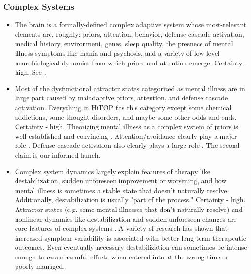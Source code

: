 \documentclass[12pt,letterpaper]{book}
\begin{document}
\subsubsection*{Complex Systems}
\begin{itemize}
    \item The brain is a formally-defined complex adaptive system whose most-relevant elements are, roughly: priors, attention, behavior, defense cascade activation, medical history, environment, genes, sleep quality, the presnece of mental illness symptoms like mania and psychosis, and a variety of low-level neurobiological dynamics from which priors and attention emerge. Certainty - high. See \textcite{friston2010free,clark2015surfing,berghSelfEvidencing,kozlowskaDefenseCascade}.
    \item Most of the dysfunctional attractor states categorized as mental illness are in large part caused by maladaptive priors, attention, and defense cascade activation. Everything in HiTOP fits this category except some chemical addictions, some thought disorders, and maybe some other odds and ends. Certainty - high. Theorizing mental illness as a complex system of priors is well-established and convincing \cite{friston2010free,hayes2020complex}. Attention/avoidance clearly play a major role \cite{berghSelfEvidencing}. Defense cascade activation also clearly plays a large role \cite{kozlowskaDefenseCascade}. The second claim is our informed hunch.
	\item Complex system dynamics largely explain features of therapy like destabilization, sudden unforeseen improvement or worsening, and how mental illness is sometimes a stable state that doesn't naturally resolve. Additionally, destabilization is usually "part of the process." Certainty - high. Attractor states (e.g. some mental illnesses that don't naturally resolve) and nonlinear dynamics like destabilization and sudden unforeseen changes are core features of complex systems \cite{olthofDestabilization}. A variety of research has shown that increased symptom variability is associated with better long-term therapeutic outcomes. Even eventually-necessary destabilization can sometimes be intense enough to cause harmful effects when entered into at the wrong time or poorly managed.

\end{itemize}
\end{document}
